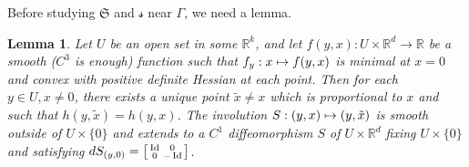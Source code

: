 \documentclass[10pt]{amsart}
\newcommand\mto{\mathchoice{\longmapsto}{\mapsto}{\mapsto}{\mapsto}}
\newenvironment{smallbmatrix}{\big[\begin{smallmatrix}}{\end{smallmatrix}\big]}
\DeclareMathOperator{\Id}{Id}
\newcommand{\Rm}{\mathbb{R}}
\newcommand{\gS}{\ensuremath{\mathfrak{S}}}
\newcommand{\ms}{\ensuremath{\mathscr{s}}}
\theoremstyle{plain}
\newtheorem{lem}{Lemma}
\theoremstyle{definition}
\begin{document}
Before studying $\gS$ and $\ms$ near $\Gamma$, we need a lemma.

\begin{lem}\label{lem-sym}
Let $U$ be an open set in some $\Rm^k$, and let $f(y,x):U\times \Rm^d\to \Rm$ be a smooth ($C^3$ is enough) function such that
$f_y:x\mto f(y,x)$ is minimal at $x=0$ and convex with positive definite Hessian at each point.
Then for each $y\in U, x\neq 0$, there exists a unique point $\tilde x \neq x$ which is proportional to $x$ and such that
$h(y,\tilde x)=h(y,x)$.
The involution $S:(y,x)\mto (y,\tilde x)$ is smooth outside of $U\times \{0\}$ and extends to a $C^1$ diffeomorphism $S$ of $U\times\Rm^d$ fixing $U\times \{0\}$
and satisfying $dS_{(y,0)}=
\begin{smallbmatrix} \Id & 0\\ 0 &-\Id\end{smallbmatrix}$.
\end{lem}
\end{document}
